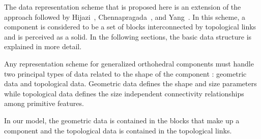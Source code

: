 	The data representation scheme that is proposed here is an extension of the
	approach followed by Hijazi~\cite{Hijazi}, Chennapragada~\cite{Venky},
	and Yang~\cite{Yang}. In this scheme, a component is considered to be a 
	set of blocks interconnected by topological links and is perceived as a 
	solid. In the following sections, the basic data structure is explained in 
	more detail.


	Any representation scheme for generalized orthohedral components must
	handle two principal types of data related to the shape of the component :
	geometric data and topological data. Geometric data defines the shape and 
	size parameters while topological data defines the size independent 
	connectivity 
	relationships among primitive features.

	
	In our model, the geometric data is contained in the blocks that make up a
	component and the topological data is contained in the topological links.

